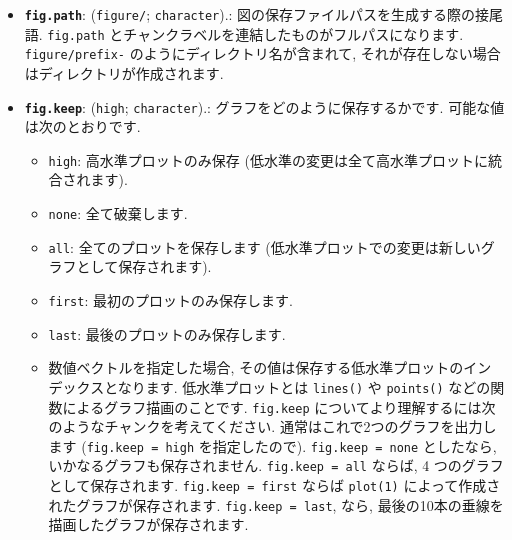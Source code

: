 \documentclass[
  11pt,
  lualatex,ja=standard,jafont=noto]{bxjsreport}
\providecommand{\tightlist}{%
  \setlength{\itemsep}{0pt}\setlength{\parskip}{0pt}}
\begin{document}
\begin{itemize}
\tightlist
\item
  \textbf{\texttt{fig.path}}: (\texttt{\textquotesingle{}figure/\textquotesingle{}}; \texttt{character}).: 図の保存ファイルパスを生成する際の接尾語. \texttt{fig.path} とチャンクラベルを連結したものがフルパスになります. \texttt{figure/prefix-} のようにディレクトリ名が含まれて, それが存在しない場合はディレクトリが作成されます.
\item
  \textbf{\texttt{fig.keep}}: (\texttt{\textquotesingle{}high\textquotesingle{}}; \texttt{character}).: グラフをどのように保存するかです. 可能な値は次のとおりです.

  \begin{itemize}
  \tightlist
  \item
    \texttt{high}: 高水準プロットのみ保存 (低水準の変更は全て高水準プロットに統合されます).
  \item
    \texttt{none}: 全て破棄します.
  \item
    \texttt{all}: 全てのプロットを保存します (低水準プロットでの変更は新しいグラフとして保存されます).
  \item
    \texttt{first}: 最初のプロットのみ保存します.
  \item
    \texttt{last}: 最後のプロットのみ保存します.
  \item
    数値ベクトルを指定した場合, その値は保存する低水準プロットのインデックスとなります. 低水準プロットとは \texttt{lines()} や \texttt{points()} などの関数によるグラフ描画のことです. \texttt{fig.keep} についてより理解するには次のようなチャンクを考えてください. 通常はこれで2つのグラフを出力します (\texttt{fig.keep = \textquotesingle{}high\textquotesingle{}} を指定したので). \texttt{fig.keep = \textquotesingle{}none\textquotesingle{}} としたなら, いかなるグラフも保存されません. \texttt{fig.keep = \textquotesingle{}all\textquotesingle{}} ならば, 4 つのグラフとして保存されます. \texttt{fig.keep = \textquotesingle{}first\textquotesingle{}} ならば \texttt{plot(1)} によって作成されたグラフが保存されます. \texttt{fig.keep = \textquotesingle{}last\textquotesingle{}}, なら, 最後の10本の垂線を描画したグラフが保存されます.
  \end{itemize}


\end{itemize}
\end{document}
